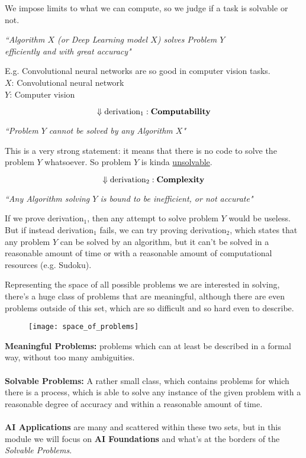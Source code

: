 \documentclass{article}
\begin{document}
			We impose limits to what we can compute, so we judge if a task is solvable or not.
			\begin{pane}
				\begin{center}
					\textit{``Algorithm $X$ (or Deep Learning model $X$) solves Problem $Y$\\ 
					efficiently and with great accuracy"}
				\end{center}
			\end{pane}
			E.g. Convolutional neural networks are so good in computer vision tasks.\\
			$X$: Convolutional neural network\\
			$Y$: Computer vision
			\begin{pane}
				$$\Downarrow{\text{derivation}_1: \text{\textbf{Computability}}}$$
				\begin{center}
					\textit{``Problem $Y$ cannot be solved by any Algorithm $X$"}
				\end{center}
			\end{pane}
			This is a very strong statement: it means that there is no code to solve the problem $Y$ whatsoever. So problem $Y$ is kinda \uline{unsolvable}.
			\begin{pane}
				$$\Downarrow{\text{derivation}_2: \text{\textbf{Complexity}}}$$
				\begin{center}
					\textit{``Any Algorithm solving $Y$ is bound to be inefficient, or not accurate"}
				\end{center}
			\end{pane}
			If we prove derivation$_1$, then any attempt to solve problem $Y$ would be useless. But if instead derivation$_1$ fails, we can try proving derivation$_2$, which states that any problem $Y$ can be solved by an algorithm, but it can't be solved in a reasonable amount of time or with a reasonable amount of computational resources (e.g. Sudoku).
			\vspace{0.2cm}
			
			Representing the space of all possible problems we are interested in solving, there's a huge class of problems that are meaningful, although there are even problems outside of this set, which are so difficult and so hard even to describe.\\
			\begin{wrapfigure}{l}{0.45\linewidth}
				\texttt{[image: space\_of\_problems]}
			\end{wrapfigure}
			\textbf{Meaningful Problems:} problems which can at least be described in a formal way, without too many ambiguities.\\\\
			\textbf{Solvable Problems:} A rather small class, which contains problems for which there is a process, which is able to solve any instance of the given problem with a reasonable degree of accuracy and within a reasonable amount of time.\\\\
			\textbf{AI Applications} are many and scattered within these two sets, but in this module we will focus on \textbf{AI Foundations} and what's at the borders of the \textit{Solvable Problems}.
\end{document}
